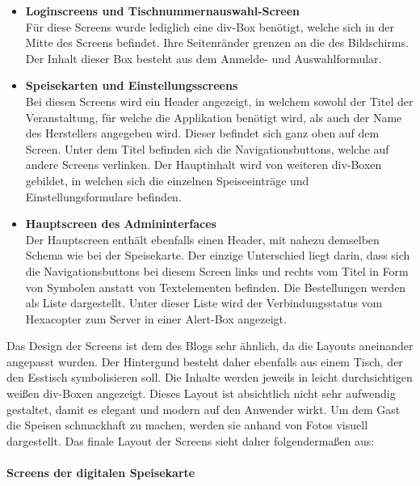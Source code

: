 \begin{itemize}
    \item \textbf{Loginscreens und Tischnummernauswahl-Screen}\\  
Für diese Screens wurde lediglich eine div-Box benötigt, welche sich in der Mitte des Screens befindet. Ihre Seitenränder grenzen an die des Bildschirms. Der Inhalt dieser Box besteht aus dem Anmelde- und Auswahlformular.
	\item \textbf{Speisekarten und Einstellungsscreens}\\
Bei diesen Screens wird ein Header angezeigt, in welchem sowohl der Titel der Veranstaltung, für welche die Applikation benötigt wird, als auch der Name des Herstellers angegeben wird. Dieser befindet sich ganz oben auf dem Screen. Unter dem Titel befinden sich die Navigationsbuttons, welche auf andere Screens verlinken. Der Hauptinhalt wird von weiteren div-Boxen gebildet, in welchen sich die einzelnen Speiseeinträge und Einstellungsformulare befinden. 
    \item \textbf{Hauptscreen des Admininterfaces}\\ 
Der Hauptscreen enthält ebenfalls einen Header, mit nahezu demselben Schema wie bei der Speisekarte. Der einzige Unterschied liegt darin, dass sich die Navigationsbuttons bei diesem Screen links und rechts vom Titel in Form von Symbolen anstatt von Textelementen befinden. Die Bestellungen werden als Liste dargestellt. Unter dieser Liste wird der Verbindungsstatus vom Hexacopter zum Server in einer Alert-Box angezeigt.
  \end{itemize}
Das Design der Screens ist dem des Blogs sehr ähnlich, da die Layouts aneinander angepasst wurden. Der Hintergund besteht daher ebenfalls aus einem Tisch, der den Esstisch symbolisieren soll. Die Inhalte werden jeweils in leicht durchsichtigen weißen div-Boxen angezeigt. Dieses Layout ist absichtlich nicht sehr aufwendig gestaltet, damit es elegant und modern auf den Anwender wirkt.
Um dem Gast die Speisen schmackhaft zu machen, werden sie anhand von Fotos visuell dargestellt.
Das finale Layout der Screens sieht daher folgendermaßen aus:\\ 
\\ 
\textbf{Screens der digitalen Speisekarte}
